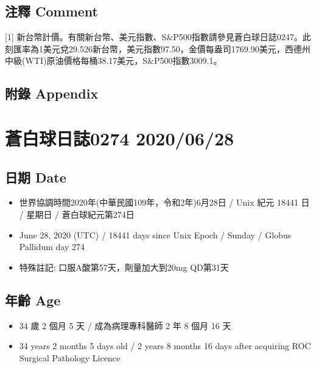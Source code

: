 \documentclass[a5paper, 11pt
]{book}
\providecommand{\tightlist}{%
  \setlength{\itemsep}{0pt}\setlength{\parskip}{0pt}}
\begin{document}
\hypertarget{ux6ce8ux91cb-comment-26}{%
\subsection{注釋 Comment}\label{ux6ce8ux91cb-comment-26}}

{[}1{]}
新台幣計價。有關新台幣、美元指數、S\&P500指數請參見蒼白球日誌0247。此刻匯率為1美元兌29.526新台幣，美元指數97.50，金價每盎司1769.90美元，西德州中級(WTI)原油價格每桶38.17美元，S\&P500指數3009.1。

\hypertarget{ux9644ux9304-appendix-26}{%
\subsection{附錄 Appendix}\label{ux9644ux9304-appendix-26}}

\hypertarget{ux84bcux767dux7403ux65e5ux8a8c0274-20200628}{%
\section{蒼白球日誌0274
2020/06/28}\label{ux84bcux767dux7403ux65e5ux8a8c0274-20200628}}

\hypertarget{ux65e5ux671f-date-27}{%
\subsection{日期 Date}\label{ux65e5ux671f-date-27}}

\begin{itemize}
\tightlist
\item
  世界協調時間2020年(中華民國109年，令和2年)6月28日 / Unix 紀元 18441 日
  / 星期日 / 蒼白球紀元第274日
\item
  June 28, 2020 (UTC) / 18441 days since Unix Epoch / Sunday / Globus
  Pallidum day 274
\item
  特殊註記: 口服A酸第57天，劑量加大到20mg QD第31天
\end{itemize}

\hypertarget{ux5e74ux9f61-age-27}{%
\subsection{年齡 Age}\label{ux5e74ux9f61-age-27}}

\begin{itemize}
\tightlist
\item
  34 歲 2 個月 5 天 / 成為病理專科醫師 2 年 8 個月 16 天
\item
  34 years 2 months 5 days old / 2 years 8 months 16 days after
  acquiring ROC Surgical Pathology Licence
\end{itemize}
\end{document}
